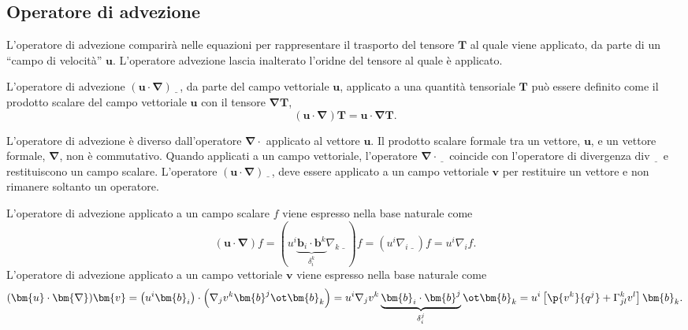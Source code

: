 \subsection{Operatore di advezione}
L'operatore di advezione comparirà nelle equazioni per rappresentare il trasporto del tensore $\bm{T}$ al quale viene applicato, da parte di un ``campo di velocità'' $\bm{u}$. L'operatore advezione lascia inalterato l'oridne del tensore al quale è applicato.
\begin{operator} L'operatore di advezione $(\bm{u} \cdot \bm{\nabla})\underline{\hspace{8pt}}$, da parte del campo vettoriale $\bm{u}$, applicato a una quantità tensoriale $\bm{T}$ può essere definito come il prodotto scalare del campo vettoriale $\bm{u}$ con il tensore $\bm{\nabla} \bm{T}$,
 \begin{equation}
  (\bm{u} \cdot \bm{\nabla}) \bm{T} = \bm{u} \cdot \bm{\nabla}\bm{T} .
 \end{equation}
 \end{operator}
 \begin{remark}
  L'operatore di advezione è diverso dall'operatore $\bm{\nabla} \cdot$ applicato al vettore $\bm{u}$. Il prodotto scalare formale tra un vettore, $\bm{u}$, e un vettore formale, $\bm{\nabla}$, non è commutativo. Quando applicati a un campo vettoriale, l'operatore $\bm{\nabla} \cdot \underline{\hspace{8pt}}$ coincide con l'operatore di divergenza $\text{div} \ \underline{\hspace{8pt}}$ e restituiscono un campo scalare. L'operatore $(\bm{u} \cdot \bm{\nabla})\underline{\hspace{8pt}} $, deve essere applicato a un campo vettoriale $\bm{v}$ per restituire un vettore e non rimanere soltanto un operatore. %
 \end{remark}
 L'operatore di advezione applicato a un campo scalare $f$ viene espresso nella base naturale come
 \begin{equation}
  (\bm{u} \cdot \bm{\nabla})f = \left( u^i \underbrace{\bm{b}_i \cdot \bm{b}^k}_{\delta_i^k} \nabla_k{\underline{\hspace{8pt}}} \right) f  = \left( u^i \nabla_i{\underline{\hspace{8pt}}} \right) f = u^i \nabla_i {f} .
 \end{equation}
 L'operatore di advezione applicato a un campo vettoriale $\bm{v}$ viene espresso nella base naturale come
 \begin{equation}
  (\bm{u} \cdot \bm{\nabla}) \bm{v} = \left( u^i \bm{b}_i \right) \cdot \left( \nabla_{j} v^k \bm{b}^j \ot \bm{b}_k \right) = 
  u^i  \nabla_{j} v^k  \underbrace{\bm{b}_i \cdot \bm{b}^j}_{\delta_i^j} \ot \bm{b}_k = u^i \left[ \p{v^k}{q^j} + \Gamma^k_{jl} v^l \right] \bm{b}_k .
 \end{equation}
